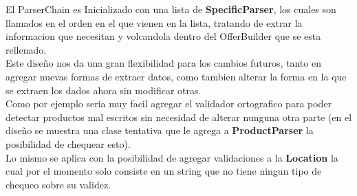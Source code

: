 \documentclass[10pt, a4paper]{article}
\begin{document}
El ParserChain es Inicializado con una lista de \textbf{SpecificParser}, los cuales son llamados en el orden en el que vienen en la lista, tratando de extrar la informacion que necesitan y volcandola dentro del OfferBuilder que se esta rellenado.\\

Este diseño nos da una gran flexibilidad para los cambios futuros, tanto en agregar nuevas formas de extraer datos, como tambien alterar la forma en la que se extraen los dados ahora sin modificar otras.\\

Como por ejemplo seria muy facil agregar el validador ortografico para poder detectar productos mal escritos sin necesidad de alterar nunguna otra parte (en el diseño se muestra una clase tentativa que le agrega a \textbf{ProductParser} la posibilidad de chequear esto).\\

Lo mismo se aplica con la posibilidad de agregar validaciones a la \textbf{Location} la cual por el momento solo consiste en un string que no tiene ningun tipo de chequeo sobre su validez.\\
\end{document}
